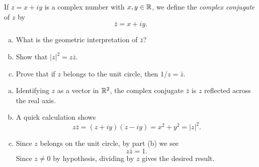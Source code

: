 \begin{exrc}[2]
    If \(z = x + iy\) is a complex number with \(x, y \in \mathbb{R}\),
    we define the \emph{complex conjugate} of \(z\) by
    \begin{equation*}
        \bar{z} = x + iy.
    \end{equation*}
    \begin{enumerate}[(a)]
    \item
        What is the geometric interpretation of \(\bar{z}\)?

    \item
        Show that \(|z|^2 = z \bar{z}\).

    \item
        Prove that if \(z\) belongs to the unit circle, then \(1 / z = \bar{z}\).
    \end{enumerate}

\begin{soln}
    \begin{enumerate}[(a)]
    \item
        Identifying \(z\) as a vector in \(\mathbb{R}^2\),
        the complex conjugate \(\bar{z}\)
        is \(z\) reflected across the real axis.

    \item
        A quick calculation shows
        \begin{equation*}
            z \bar{z} = (z + iy)(z - iy) = x^2 + y^2 = |z|^2.
        \end{equation*}

    \item
        Since \(z\) belongs on the unit circle,
        by part (b) we see
        \begin{equation*}
            z \bar{z} = 1.
        \end{equation*}
        Since \(z \neq 0\) by hypothesis,
        dividing by \(z\) gives the desired result.

    \end{enumerate}

\end{soln}
\end{exrc}
